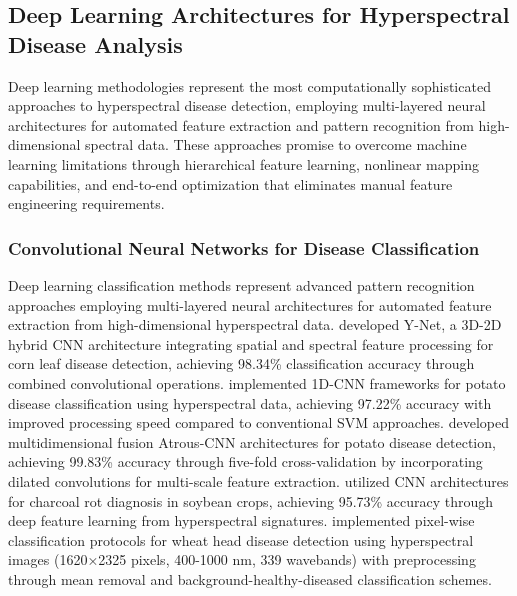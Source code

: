 \documentclass[sn-mathphys]{sn-jnl}
\theoremstyle{thmstyleone}%
\theoremstyle{thmstyletwo}%
\theoremstyle{thmstylethree}%
\begin{document}


\subsection{Deep Learning Architectures for Hyperspectral Disease Analysis}
Deep learning methodologies represent the most computationally sophisticated approaches to hyperspectral disease detection, employing multi-layered neural architectures for automated feature extraction and pattern recognition from high-dimensional spectral data. These approaches promise to overcome machine learning limitations through hierarchical feature learning, nonlinear mapping capabilities, and end-to-end optimization that eliminates manual feature engineering requirements. 

\subsubsection{Convolutional Neural Networks for Disease Classification}
Deep learning classification methods represent advanced pattern recognition approaches employing multi-layered neural architectures for automated feature extraction from high-dimensional hyperspectral data. \citet{jia2023net} developed Y-Net, a 3D-2D hybrid CNN architecture integrating spatial and spectral feature processing for corn leaf disease detection, achieving 98.34\% classification accuracy through combined convolutional operations. \citet{liu2020disease} implemented 1D-CNN frameworks for potato disease classification using hyperspectral data, achieving 97.22\% accuracy with improved processing speed compared to conventional SVM approaches. \citet{gao2023detection} developed multidimensional fusion Atrous-CNN architectures for potato disease detection, achieving 99.83\% accuracy through five-fold cross-validation by incorporating dilated convolutions for multi-scale feature extraction. \citet{nagasubramanian2019plant} utilized CNN architectures for charcoal rot diagnosis in soybean crops, achieving 95.73\% accuracy through deep feature learning from hyperspectral signatures. \citet{jin2018classifying} implemented pixel-wise classification protocols for wheat head disease detection using hyperspectral images (1620×2325 pixels, 400-1000 nm, 339 wavebands) with preprocessing through mean removal and background-healthy-diseased classification schemes.
\end{document}
